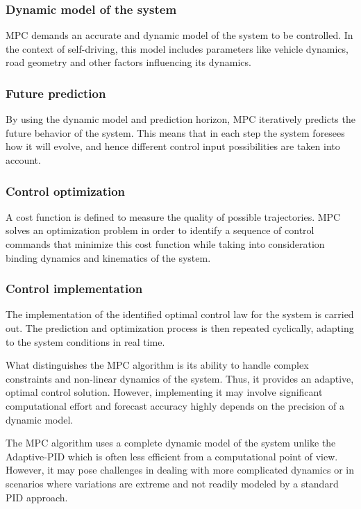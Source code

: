 \documentclass[conference]{IEEEtran}
\begin{document}
\subsubsection{Dynamic model of the system}
MPC demands an accurate and dynamic model of the system to be controlled.
%
In the context of self-driving, this model includes parameters like vehicle dynamics, road geometry and other factors influencing its dynamics.

\subsubsection{Future prediction}
 By using the dynamic model and prediction horizon, MPC iteratively predicts the future behavior of the system.
%
This means that in each step the system foresees how it will evolve, and hence different control input possibilities are taken into account.

\subsubsection{Control optimization}
A cost function is defined to measure the quality of possible trajectories.
%
MPC solves an optimization problem in order to identify a sequence of control commands that minimize this cost function while taking into consideration binding dynamics and kinematics of the system.

\subsubsection{Control implementation}
The implementation of the identified optimal control law for the system is carried out.
%
The prediction and optimization process is then repeated cyclically, adapting to the system conditions in real time.

\medskip

What distinguishes the MPC algorithm is its ability to handle complex constraints and non-linear dynamics of the system.
%
Thus, it provides an adaptive, optimal control solution.
%
However, implementing it may involve significant computational effort and forecast accuracy highly depends on the precision of a dynamic model.

\medskip

The MPC algorithm uses a complete dynamic model of the system unlike the Adaptive-PID which is often less efficient from a computational point of view.
%
However, it may pose challenges in dealing with more complicated dynamics or in scenarios where variations are extreme and not readily modeled by a standard PID approach.
\end{document}
